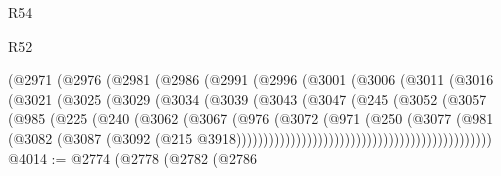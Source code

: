 \begin{lexlean}{R54}
\begin{lexlean}{R52}
\begin{coremodule}
{{{{{{{{{{{{{{{{{{{{{{{{{{{{{{{{{{{{{{{{{{{{{{{{{{{{{{{{{{{{{{{{{{{{{{{{{{{{{{{{{{{{{{{{{{{{{{{{{{{{{{{{{{{{{{{{{{{{{{{{{{{{{{{{{{{{{{{{{{{{{{{{{{{{{{{{{{{{{{{{{{{{{{{{{{{{{{{{{{{{{{{{{{{{{{{{{{{{{{                            (@2971
                              (@2976
                                (@2981
                                  (@2986
                                    (@2991
                                      (@2996
                                        (@3001
                                          (@3006
                                            (@3011
                                              (@3016
                                                (@3021
                                                  (@3025
                                                    (@3029
                                                      (@3034
                                                        (@3039
                                                          (@3043
                                                            (@3047
                                                              (@245
                                                                (@3052
                                                                  (@3057
                                                                    (@985
                                                                      (@225
                                                                        (@240
                                                                          (@3062
                                                                            (@3067
                                                                              (@976
                                                                                (@3072
                                                                                  (@971
                                                                                    (@250
                                                                                      (@3077
                                                                                        (@981
                                                                                          (@3082
                                                                                            (@3087
                                                                                              (@3092
                                                                                                (@215
                                                                                                  @3918)))))))))))))))))))))))))))))))))))))))))))))))
@4014 := @2774
    (@2778
      (@2782
        (@2786
}}}}}}}}}}}}}}}}}}}}}}}}}}}}}}}}}}}}}}}}}}}}}}}}}}}}}}}}}}}}}}}}}}}}}}}}}}}}}}}}}}}}}}}}}}}}}}}}}}}}}}}}}}}}}}}}}}}}}}}}}}}}}}}}}}}}}}}}}}}}}}}}}}}}}}}}}}}}}}}}}}}}}}}}}}}}}}}}}}}}}}}}}}}}}}}}}}}}}}
\end{coremodule}
\end{lexlean}
\end{lexlean}
